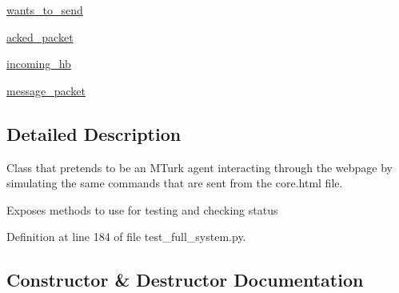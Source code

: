 \begin{DoxyCompactItemize}
\item 
\hyperlink{classparlai_1_1mturk_1_1core_1_1legacy__2018_1_1test_1_1test__full__system_1_1MockAgent_a1ef4f0d984c2623ad065a6221231ad1d}{wants\+\_\+to\+\_\+send}
\item 
\hyperlink{classparlai_1_1mturk_1_1core_1_1legacy__2018_1_1test_1_1test__full__system_1_1MockAgent_a37c64a2f56235c57623bcf0191691231}{acked\+\_\+packet}
\item 
\hyperlink{classparlai_1_1mturk_1_1core_1_1legacy__2018_1_1test_1_1test__full__system_1_1MockAgent_a97750b8b1110e029b4e82323576f5eb4}{incoming\+\_\+hb}
\item 
\hyperlink{classparlai_1_1mturk_1_1core_1_1legacy__2018_1_1test_1_1test__full__system_1_1MockAgent_ae10810ea77ff6a8322a3f25aa34fb4e5}{message\+\_\+packet}
\end{DoxyCompactItemize}


\subsection{Detailed Description}
\begin{DoxyVerb}Class that pretends to be an MTurk agent interacting through the webpage by
simulating the same commands that are sent from the core.html file.

Exposes methods to use for testing and checking status
\end{DoxyVerb}
 

Definition at line 184 of file test\+\_\+full\+\_\+system.\+py.



\subsection{Constructor \& Destructor Documentation}
\mbox{\label{classparlai_1_1mturk_1_1core_1_1legacy__2018_1_1test_1_1test__full__system_1_1MockAgent_a43e345d7f00632635a5a8f782feda7ba}} 
